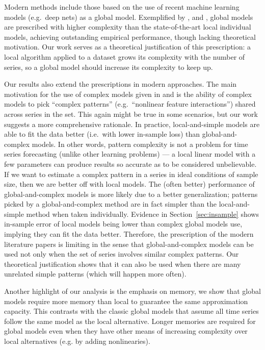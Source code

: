 \documentclass[a4paper]{article}
\theoremstyle{custom}
\begin{document}
Modern methods include those based on the use of recent machine learning models (e.g.\ deep nets) as a global model. Exemplified by \cite{salinas2019DeepAR}, \cite{laptev2017extreme} and \cite{bandara2020cluster}, global models are prescribed with higher complexity than the state-of-the-art local individual models, achieving outstanding empirical performance, though lacking theoretical motivation. Our work serves as a theoretical justification of this prescription: a local algorithm applied to a dataset grows its complexity with the number of series, so a global model should increase its complexity to keep up.

Our results also extend the prescriptions in modern approaches. The main motivation for the use of complex models given in \cite{salinas2019DeepAR} and \cite{laptev2017extreme} is the ability of complex models to pick ``complex patterns'' (e.g.\ ``nonlinear feature interactions'') shared across series in the set. This again might be true in some scenarios, but our work suggests a more comprehensive rationale. In practice, local-and-simple models are able to fit the data better (i.e.\ with lower in-sample loss) than global-and-complex models. In other words, pattern complexity is not a problem for time series forecasting (unlike other learning problems) --- a local linear model with a few parameters can produce results so accurate as to be considered unbelievable. If we want to estimate a complex pattern in a series in ideal conditions of sample size, then we are better off with local models. The (often better) performance of global-and-complex models is more likely due to a better generalization; patterns picked by a global-and-complex method are in fact simpler than the local-and-simple method when taken individually. Evidence in Section~\ref{sec:insample} shows in-sample error of local models being lower than complex global models use, implying they can fit the data better. Therefore, the prescription of the modern literature papers is limiting in the sense that global-and-complex models can be used not only when the set of series involves similar complex patterns. Our theoretical justification shows that it can also be used when there are many unrelated simple patterns (which will happen more often).

Another highlight of our analysis is the emphasis on memory, we show that global models require more memory than local to guarantee the same approximation capacity. This contrasts with the classic global models that assume all time series follow the same model as the local alternative. Longer memories are required for global models even when they have other means of increasing complexity over local alternatives (e.g. by adding nonlinearies).
\end{document}
